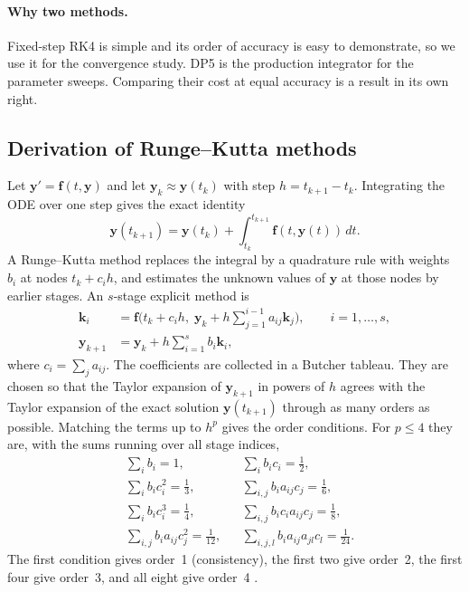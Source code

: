 \paragraph{Why two methods.} Fixed-step RK4 is simple and its order of accuracy is easy to demonstrate, so we use it for the convergence study. DP5 is the production integrator for the parameter sweeps. Comparing their cost at equal accuracy is a result in its own right.

\subsection{Derivation of Runge--Kutta methods}
\label{sec:method-derivation}

Let $\mathbf{y}'=\mathbf{f}(t,\mathbf{y})$ and let $\mathbf{y}_k\approx\mathbf{y}(t_k)$ with step $h=t_{k+1}-t_k$. Integrating the ODE over one step gives the exact identity
\begin{equation}
\mathbf{y}(t_{k+1})=\mathbf{y}(t_k)+\int_{t_k}^{t_{k+1}}\mathbf{f}(t,\mathbf{y}(t))\,dt .
\end{equation}
A Runge--Kutta method replaces the integral by a quadrature rule with weights $b_i$ at nodes $t_k+c_ih$, and estimates the unknown values of $\mathbf{y}$ at those nodes by earlier stages. An $s$-stage explicit method is
\begin{align}
\mathbf{k}_i &= \mathbf{f}\!\Big(t_k+c_ih,\;\mathbf{y}_k+h\sum_{j=1}^{i-1}a_{ij}\mathbf{k}_j\Big),\qquad i=1,\dots,s,
\label{eq:stages}\\
\mathbf{y}_{k+1}&=\mathbf{y}_k+h\sum_{i=1}^{s}b_i\mathbf{k}_i ,
\label{eq:update}
\end{align}
where $c_i=\sum_j a_{ij}$. The coefficients are collected in a Butcher tableau. They are chosen so that the Taylor expansion of $\mathbf{y}_{k+1}$ in powers of $h$ agrees with the Taylor expansion of the exact solution $\mathbf{y}(t_{k+1})$ through as many orders as possible. Matching the terms up to $h^p$ gives the order conditions. For $p\le4$ they are, with the sums running over all stage indices,
\begin{equation}
\begin{aligned}
&\textstyle\sum_i b_i=1, &&\textstyle\sum_i b_ic_i=\tfrac12,\\
&\textstyle\sum_i b_ic_i^2=\tfrac13, &&\textstyle\sum_{i,j} b_ia_{ij}c_j=\tfrac16,\\
&\textstyle\sum_i b_ic_i^3=\tfrac14, &&\textstyle\sum_{i,j} b_ic_ia_{ij}c_j=\tfrac18,\\
&\textstyle\sum_{i,j} b_ia_{ij}c_j^2=\tfrac1{12}, &&\textstyle\sum_{i,j,l} b_ia_{ij}a_{jl}c_l=\tfrac1{24}.
\end{aligned}
\label{eq:order}
\end{equation}
The first condition gives order~1 (consistency), the first two give order~2, the first four give order~3, and all eight give order~4 \cite{hairer1993,butcher2016}.

